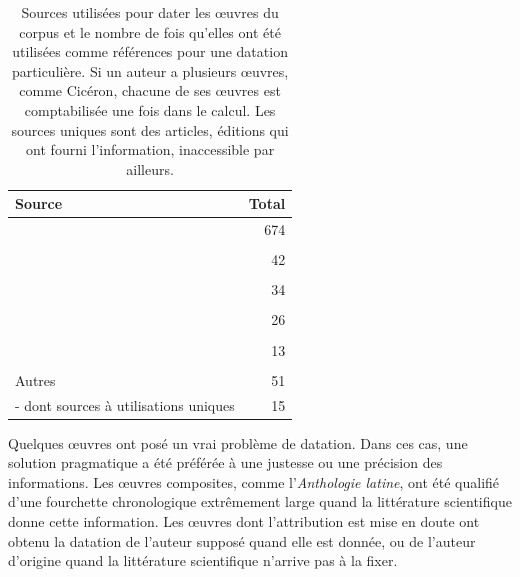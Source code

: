 \begin{table}[]
    \centering
    \begin{tabularx}{\textwidth}{X|r}
    \toprule
    Source & Total \\ \midrule
    \cite{zehnacker_litterature_2013} & 674 \\ 
    & \\
    \cite{noauthor_base_nodate} & 42 \\
    & \\
    \cite{lana_metodologie_2012} & 34 \\
    & \\
    \cite{buchwald_dictionnaire_1991} & 26 \\
    & \\
    \cite{hornblower_oxford_1996} &     13 \\
    & \\ \midrule
    Autres & 51 \\ 
    - dont sources à utilisations uniques & 15 \\\bottomrule
    \end{tabularx}
    \caption{Sources utilisées pour dater les œuvres du corpus et le nombre de fois qu'elles ont été utilisées comme références pour une datation particulière. Si un auteur a plusieurs œuvres, comme Cicéron, chacune de ses œuvres est comptabilisée une fois dans le calcul. Les sources uniques sont des articles, éditions qui ont fourni l'information, inaccessible par ailleurs.}
    \label{tab:chap1:sources-fredouilles}
\end{table}

Quelques œuvres ont posé un vrai problème de datation. Dans ces cas, une solution pragmatique a été préférée à une justesse ou une précision des informations. Les œuvres composites, comme l'\textit{Anthologie latine}, ont été qualifié d'une fourchette chronologique extrêmement large quand la littérature scientifique donne cette information. Les œuvres dont l'attribution est mise en doute ont obtenu la datation de l'auteur supposé quand elle est donnée, ou de l'auteur d'origine quand la littérature scientifique n'arrive pas à la fixer.

